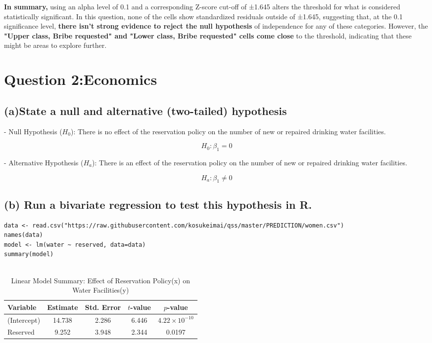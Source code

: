 \documentclass[12pt]{article}
\begin{document}
\textbf{In summary,} using an alpha level of 0.1 and a corresponding Z-score cut-off of ±1.645 alters the threshold for what is considered statistically significant. In this question, none of the cells show standardized residuals outside of ±1.645, suggesting that, at the 0.1 significance level, \textbf{there isn't strong evidence to reject the null hypothesis }of independence for any of these categories. However, the \textbf{"Upper class, Bribe requested" and "Lower class, Bribe requested" cells come close }to the threshold, indicating that these might be areas to explore further.


\newpage
\section{Question 2:Economics}

\subsection{(a)State a null and alternative (two-tailed) hypothesis}
 - Null Hypothesis (\( H_0 \)): There is no effect of the reservation policy on the number of new or repaired drinking water facilities.
  
  \[
  H_0: \beta_1 = 0
  \]
  
- Alternative Hypothesis (\( H_a \)): There is an effect of the reservation policy on the number of new or repaired drinking water facilities.

  \[
  H_a: \beta_1 \neq 0
  \]

\subsection{(b) Run a bivariate regression to test this hypothesis in R.}
\lstset{style=my}
\begin{lstlisting}
data <- read.csv("https://raw.githubusercontent.com/kosukeimai/qss/master/PREDICTION/women.csv")
names(data)
model <- lm(water ~ reserved, data=data)
summary(model)
    
\end{lstlisting}




\begin{table}[h]
    \centering
    \caption{Linear Model Summary: Effect of Reservation Policy(x) on Water Facilities(y)}
    \begin{tabular}{lcccc}
        \toprule
        Variable    & Estimate & Std. Error & \( t \)-value & \( p \)-value \\
        \midrule
        (Intercept) & 14.738   & 2.286      & 6.446         & \(4.22 \times 10^{-10}\) \\
        Reserved    & 9.252    & 3.948      & 2.344         & 0.0197 \\
        \bottomrule
    \end{tabular}
    \label{tab:model_summary}
\end{table}
\end{document}
